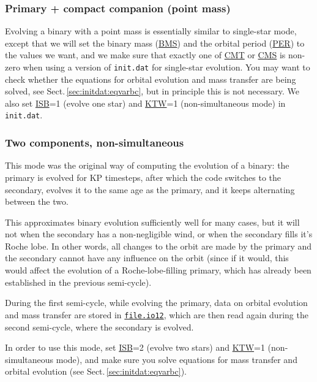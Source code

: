 \subsubsection{Primary + compact companion (point mass)}

Evolving a binary with a point mass is essentially similar to single-star mode, except that we will set the binary
mass (\hyperlink{bms}{BMS}) and the orbital period (\hyperlink{per}{PER}) to the values we want, and we make sure 
that exactly one of \hyperlink{cmt}{CMT} or \hyperlink{cms}{CMS} is non-zero when using a version of \texttt{init.dat}
for single-star evolution.  You may want to check whether the equations for orbital evolution and mass transfer are 
being solved, see Sect.\,\ref{sec:initdat:eqvarbc}, but in principle this is not necessary.
We also set \hyperlink{isb}{ISB}=1 (evolve one star) and \hyperlink{ktw}{KTW}=1 (non-simultaneous mode) in \texttt{init.dat}.


\subsubsection{Two components, non-simultaneous}

This mode was the original way of computing the evolution of a binary: the primary is evolved for \hypertarget{kp}{KP} 
timesteps, after which the code switches to the secondary, evolves it to the same age as the primary, and it keeps
alternating between the two.

This approximates binary evolution sufficiently well for many cases, but it will not when the secondary has a 
non-negligible wind, or when the secondary fills it's Roche lobe.  In other words, all changes to the orbit are
made by the primary and the secondary cannot have any influence on the orbit (since if it would, this would affect
the evolution of a Roche-lobe-filling primary, which has already been established in the previous semi-cycle).

During the first semi-cycle, while evolving the primary, data on orbital evolution and mass transfer are stored in 
\hyperlink{io12}{\texttt{file.io12}}, which are then read again during the second semi-cycle, where the secondary is evolved.

In order to use this mode, set \hyperlink{isb}{ISB}=2 (evolve two stars) and \hyperlink{ktw}{KTW}=1 (non-simultaneous mode),
and make sure you solve equations for mass transfer and orbital evolution (see Sect.\,\ref{sec:initdat:eqvarbc}).



